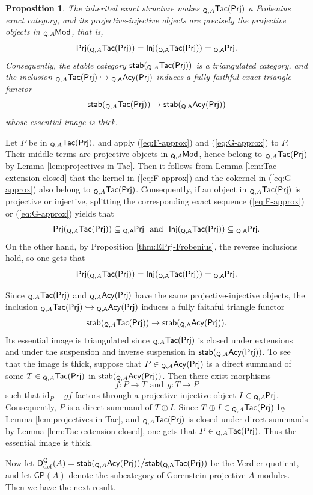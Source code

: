 \documentclass{amsart}
\theoremstyle{bfupright head,slanted body}
\theoremstyle{bfupright head,upright body}
\theoremstyle{fixed bf head,slanted body}
\newtheorem{prp}[res]{Proposition}      \newtheorem*{prp*}{Proposition}
\theoremstyle{fixed bf head,upright body}
\theoremstyle{numbered paragraph}
\newenvironment{prf*}[1][Proof]{%
	\begin{proof}[\bf #1]
		\setcounter{equation}{0}
		\renewcommand{\theequation}{\arabic{equation}}}
	{\end{proof}
}
\numberwithin{equation}{res}
\newcommand{\GP}[1]{\mathsf{GP}(#1)}
\newcommand{\TacQ}{{}_{\Q,A}\mathsf{Tac}(\sf Prj)}
\newcommand{\AcQ}{{}_{\Q,A}\mathsf{Acy}(\sf Prj)}
\newcommand{\Prj}[1]{\mathsf{Prj}(#1)}
\newcommand{\Inj}[1]{\mathsf{Inj}(#1)}
\newcommand{\Q}{\mathsf{Q}}
\newcommand{\lMod}[1]{{}_{#1}\mspace{-1mu}{\sf{Mod}}}
\newcommand{\lPrj}[1]{{}_{#1}\mspace{-1mu}{\sf{Prj}}}
\begin{document}
\begin{prp}\label{thm:Tac-Frobenius}
The inherited exact structure makes $\TacQ$ a Frobenius exact category, and its projective-injective objects are precisely the projective objects in $\lMod{\Q,A}$, that is,
$$\Prj{\TacQ}=\Inj{\TacQ}=\lPrj{\Q,A}.$$
Consequently, the stable category $\mathsf{stab}(\TacQ)$ is a triangulated category, and the inclusion $\TacQ\hookrightarrow\AcQ$ induces a fully faithful exact triangle functor
$$\mathsf{stab}(\TacQ)\to\mathsf{stab}(\AcQ)$$
whose essential image is thick.
\end{prp}

\begin{prf*}
Let $P$ be in $\TacQ$, and apply (\ref{eq:F-approx}) and (\ref{eq:G-approx}) to $P$. Their middle terms are projective objects in $\lMod{\Q,A}$, hence belong to $\TacQ$ by Lemma \ref{lem:projectives-in-Tac}. Then it follows from Lemma \ref{lem:Tac-extension-closed} that the kernel in (\ref{eq:F-approx}) and the cokernel in (\ref{eq:G-approx}) also belong to $\TacQ$. Consequently, if an object in $\TacQ$ is projective or injective, splitting the
corresponding exact sequence (\ref{eq:F-approx}) or (\ref{eq:G-approx}) yields that
$$\Prj{\TacQ}\subseteq\lPrj{\Q,A}\ \ \text{and}\ \ \Inj{\TacQ}\subseteq\lPrj{\Q,A}.$$
On the other hand, by Proposition \ref{thm:EPrj-Frobenius}, the reverse inclusions hold, so one gets that
$$\Prj{\TacQ}=\Inj{\TacQ}=\lPrj{\Q,A}.$$

Since $\TacQ$ and $\AcQ$ have the same projective-injective objects, the inclusion $\TacQ\hookrightarrow\AcQ$ induces a fully faithful triangle functor
$$\mathsf{stab}(\TacQ)\to\mathsf{stab}(\AcQ).$$
Its essential image is triangulated since $\TacQ$ is closed under extensions and under the suspension and inverse suspension in $\mathsf{stab}(\AcQ)$. To see that the image is thick, suppose that $P\in\AcQ$ is a direct summand of some $T\in\TacQ$ in $\mathsf{stab}(\AcQ)$. Then there exist morphisms 
$$f: P\to T\ \ \text{and}\ \ g: T\to P$$
such that $\mathrm{id}_P-gf$ factors through a
projective-injective object $I\in\lPrj{\Q,A}$. Consequently, $P$ is a direct summand of $T\oplus I$. Since $T\oplus I\in\TacQ$ by Lemma \ref{lem:projectives-in-Tac}, and $\TacQ$ is closed under direct summands by Lemma \ref{lem:Tac-extension-closed}, one gets that $P\in\TacQ$. Thus the essential image is thick.
\end{prf*}

Now let $\mathsf D_{\mathrm{def}}^{\Q}(A)=\mathsf{stab}(\AcQ)\big/\mathsf{stab}(\TacQ)$ be the Verdier quotient, and let $\GP{A}$ denote the subcategory of Gorenstein projective $A$-modules. Then we have the next result.
\end{document}
